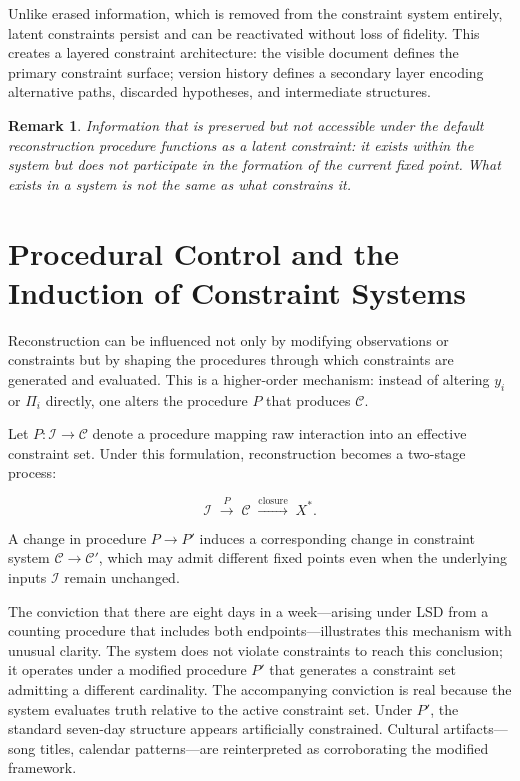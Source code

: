 \documentclass[12pt, letterpaper]{article}
\theoremstyle{flyxion}
\newtheorem*{remark}{Remark}
\begin{document}
Unlike erased information, which is removed from the constraint system entirely, latent constraints persist and can be reactivated without loss of fidelity. This creates a layered constraint architecture: the visible document defines the primary constraint surface; version history defines a secondary layer encoding alternative paths, discarded hypotheses, and intermediate structures.

\begin{remark}
Information that is preserved but not accessible under the default reconstruction procedure functions as a latent constraint: it exists within the system but does not participate in the formation of the current fixed point. What exists in a system is not the same as what constrains it.
\end{remark}

\section{Procedural Control and the Induction of Constraint Systems}

Reconstruction can be influenced not only by modifying observations or constraints but by shaping the procedures through which constraints are generated and evaluated. This is a higher-order mechanism: instead of altering $y_i$ or $\Pi_i$ directly, one alters the procedure $P$ that produces $\mathcal{C}$.

Let $P : \mathcal{I} \to \mathcal{C}$ denote a procedure mapping raw interaction into an effective constraint set. Under this formulation, reconstruction becomes a two-stage process:

\begin{equation}
\mathcal{I} \;\xrightarrow{P}\; \mathcal{C} \;\xrightarrow{\text{closure}}\; X^*.
\end{equation}

A change in procedure $P \to P'$ induces a corresponding change in constraint system $\mathcal{C} \to \mathcal{C}'$, which may admit different fixed points even when the underlying inputs $\mathcal{I}$ remain unchanged.

The conviction that there are eight days in a week---arising under LSD from a counting procedure that includes both endpoints---illustrates this mechanism with unusual clarity. The system does not violate constraints to reach this conclusion; it operates under a modified procedure $P'$ that generates a constraint set admitting a different cardinality. The accompanying conviction is real because the system evaluates truth relative to the active constraint set. Under $P'$, the standard seven-day structure appears artificially constrained. Cultural artifacts---song titles, calendar patterns---are reinterpreted as corroborating the modified framework.
\end{document}

